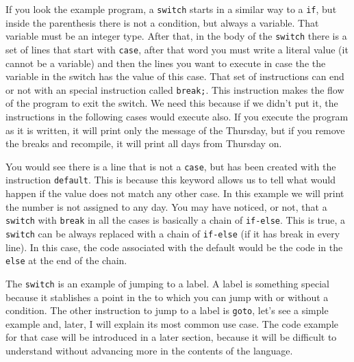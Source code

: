 \documentclass[a4paper]{article}
\begin{document}
If you look the example program, a \texttt{switch} starts in a similar way to
a \verb!if!, but inside the parenthesis there is not a condition, but always a
variable. That variable must be an integer type. After that, in the body
of the \texttt{switch} there is a set of lines that start with \verb!case!,
after that word you must write a literal value (it cannot be a variable) and
then the lines you want to execute in case the the variable in the switch has
the value of this case. That set of instructions can end or not with an special
instruction called \lstinline[style=C]!break;!. This instruction makes the
flow of the program to exit the switch. We need this because if we didn't put
it, the instructions in the following cases would execute also. If you execute
the program as it is written, it will print only the message of the Thursday, but
if you remove the breaks and recompile, it will print all days from Thursday on.

You would see there is a line that is not a \texttt{case}, but has been created
with the instruction \texttt{default}. This is because this keyword allows us
to tell what would happen if the value does not match any other case. In this
example we will print the number is not assigned to any day. You may have
noticed, or not, that a \texttt{switch} with \texttt{break} in all the cases
is basically a chain of \texttt{if-else}. This is true, a \texttt{switch} can be
always replaced with a chain of \texttt{if-else} (if it has break in every
line). In this case, the code associated with the default would be the code
in the \texttt{else} at the end of the chain.

The \texttt{switch} is an example of jumping to a label. A label is something
special because it stablishes a point in the to which you can jump with or
without a condition. The other instruction to jump to a label is \texttt{goto},
let's see a simple example and, later, I will explain its most common use case.
The code example for that case will be introduced in a later section, because
it will be difficult to understand without advancing more in the contents of
the language.
\end{document}
